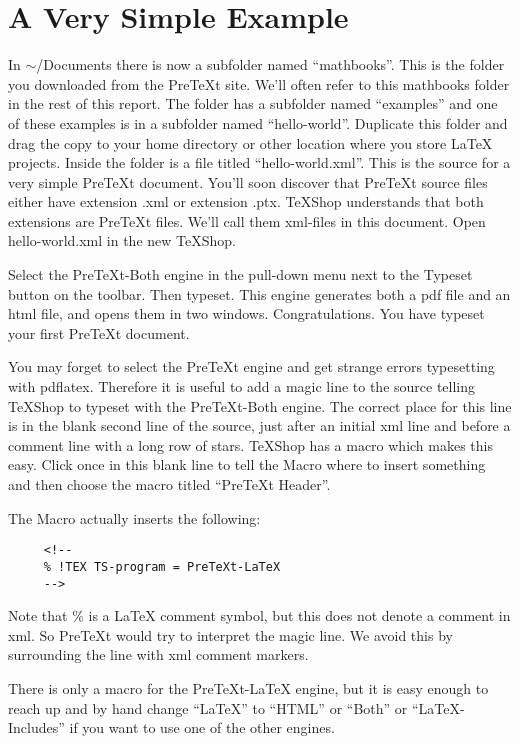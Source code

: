 \documentclass[11pt, oneside]{article}   	%
\begin{document}
 \section{A Very Simple Example}
 
 In $\sim$/Documents there is now a subfolder named ``mathbooks''. This is the folder you downloaded from the PreTeXt site. We'll often refer to this mathbooks folder in the rest of this report. The folder has a subfolder named ``examples''  and one of these examples is in a subfolder named ``hello-world''. Duplicate this folder and drag the copy to your home directory or other location where you store LaTeX projects.  Inside the folder is a file titled ``hello-world.xml''. This is the source for a very simple PreTeXt document. You'll soon discover that PreTeXt source files either have extension .xml or  extension .ptx. TeXShop understands that both extensions are PreTeXt files. We'll call them xml-files in this document. Open hello-world.xml in the new TeXShop.

Select the PreTeXt-Both engine in the pull-down menu next to the Typeset button on the toolbar. Then typeset. This engine generates both a pdf file and an html file, and opens them in two windows. Congratulations. You have typeset your first PreTeXt document.

You may forget to select the PreTeXt engine and get strange errors typesetting with pdflatex. Therefore it is useful to add a magic line to the source telling TeXShop to typeset with the PreTeXt-Both engine. The correct place for this line is in the blank second line of the source, just after an initial xml line and before a comment line with a long row of stars. TeXShop has a macro which makes this easy. Click once in this blank line to tell the Macro where to insert something and then choose the macro titled ``PreTeXt Header''. 

The Macro actually inserts the following:
\begin{verbatim}
     <!--
     % !TEX TS-program = PreTeXt-LaTeX
     -->
\end{verbatim}

Note that \% is a LaTeX comment symbol, but this does not denote a comment in xml.  So  PreTeXt would try to interpret the magic line. We avoid this by surrounding the line with xml comment markers. 

There is only a macro for the PreTeXt-LaTeX engine, but it is easy enough to reach up and by hand change ``LaTeX'' to ``HTML'' or ``Both'' or ``LaTeX-Includes'' if you want to use one of the other engines. 
\end{document}
